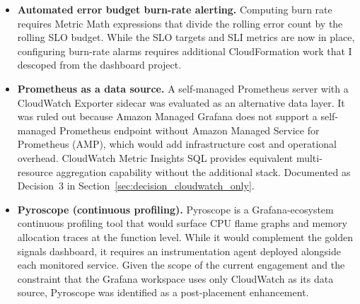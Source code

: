 \begin{itemize}
    \item \textbf{Automated error budget burn-rate alerting.} Computing
          burn rate requires Metric Math expressions that divide the
          rolling error count by the rolling SLO budget. While the SLO
          targets and SLI metrics are now in place, configuring
          burn-rate alarms requires additional CloudFormation work that
          I descoped from the dashboard project.

    \item \textbf{Prometheus as a data source.} A self-managed Prometheus
          server with a CloudWatch Exporter sidecar was evaluated as an
          alternative data layer. It was ruled out because Amazon Managed
          Grafana does not support a self-managed Prometheus endpoint
          without Amazon Managed Service for Prometheus (AMP), which
          would add infrastructure cost and operational overhead.
          CloudWatch Metric Insights SQL provides equivalent
          multi-resource aggregation capability without the additional
          stack. Documented as Decision~3 in
          Section~\ref{sec:decision_cloudwatch_only}.

    \item \textbf{Pyroscope (continuous profiling).} Pyroscope is a
          Grafana-ecosystem continuous profiling tool that would surface
          CPU flame graphs and memory allocation traces at the function
          level. While it would complement the golden signals dashboard,
          it requires an instrumentation agent deployed alongside each
          monitored service. Given the scope of the current engagement
          and the constraint that the Grafana workspace uses only
          CloudWatch as its data source, Pyroscope was identified as a
          post-placement enhancement.
\end{itemize}


\FloatBarrier
